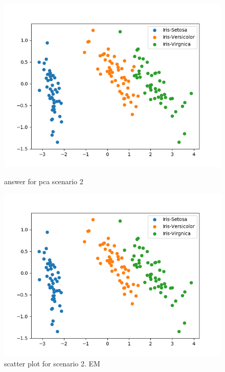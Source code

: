 \documentclass[a4paper]{article}
\begin{document}
        \begin{figure}[h!]
            \centering
            \begin{minipage}[t]{6.5cm}
              \includegraphics[width=1.0\textwidth]{pca_em_2_ans.png}
              \caption{answer for pca scenario 2}
            \end{minipage}
            \hspace{2cm}
            \begin{minipage}[t]{6.5cm}
              \includegraphics[width=1.0\textwidth]{pca_em_2_1.png}
              \caption{scatter plot for scenario 2. EM}
            \end{minipage}
        \end{figure}
\end{document}
